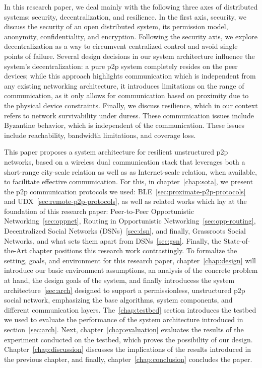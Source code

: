 In this research paper, we deal mainly with the following three axes of distributed systems: security, decentralization, and resilience.
In the first axis, security, we discuss the security of an open distributed system, its permission model, anonymity, confidentiality, and encryption.
Following the security axis, we explore decentralization as a way to circumvent centralized control and avoid single points of failure. Several design decisions in our system architecture influence the system's decentralization: a pure p2p system completely resides on the peer devices; while this approach highlights communication which is independent from any existing networking architecture, it introduces limitations on the range of communication, as it only allows for communication based on proximity due to the physical device constraints.
Finally, we discuss resilience, which in our context refers to network survivability under duress. These communication issues include Byzantine behavior, which is independent of the communication. These issues include reachability, bandwidth limitations, and coverage loss.

This paper proposes a system architecture for resilient unstructured p2p networks, based on a wireless dual communication stack that leverages both a short-range city-scale relation as well as as Internet-scale relation, when available, to facilitate effective communication.
For this, in chapter~\ref{chap:sota}, we present the p2p communication protocols we used: BLE~\ref{sec:proximate-p2p-protocols} and UDX~\ref{sec:remote-p2p-protocols}, as well as related works which lay at the foundation of this research paper: Peer-to-Peer Opportunistic Networking~\ref{sec:oppnet}, Routing in Opportunistic Networking~\ref{sec:opp-routing}, Decentralized Social Networks (DSNs)~\ref{sec:dsn}, and finally, Grassroots Social Networks, and what sets them apart from DSNs~\ref{sec:gsn}. Finally, the State-of-the-Art chapter positions this research work contrastingly.
To formalize the setting, goals, and environment for this research paper, chapter~\ref{chap:design} will introduce our basic environment assumptions, an analysis of the concrete problem at hand, the design goals of the system, and finally introducess the system architecture~\ref{sec:arch} designed to support a permissionless, unstructured p2p social network, emphasizing the base algorithms, system components, and different communication layers.
The~\ref{chap:testbed} section introduces the testbed we used to evaluate the performance of the system architecture introduced in section~\ref{sec:arch}.
Next, chapter~\ref{chap:evaluation} evaluates the results of the experiment conducted on the testbed, which proves the possibility of our design.
Chapter~\ref{chap:discussion} discusses the implications of the results introduced in the previous chapter, and finally, chapter~\ref{chap:conclusion} concludes the paper.